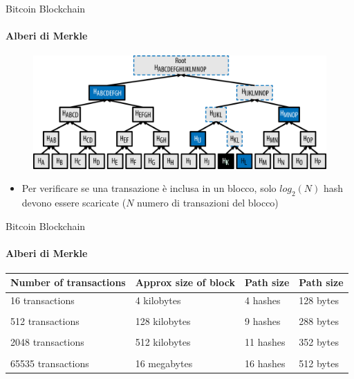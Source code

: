 \documentclass{beamer}
\begin{document}
  \begin{frame}{Bitcoin Blockchain}
    \framesubtitle{Alberi di Merkle}
    \begin{figure}
      \includegraphics[width=0.6\linewidth]{../img/merkle-tree-path.png}
    \end{figure}
    \begin{itemize}
        \item Per verificare se una transazione è inclusa in un blocco, solo  $log_2(N)$ hash devono essere scaricate ($N$ numero di transazioni del blocco)
    \end{itemize}
  \end{frame}
  
  
  
  
  
  \begin{frame}{Bitcoin Blockchain}
  \framesubtitle{Alberi di Merkle}
      \footnotesize
       \begin{tabularx}{\textwidth}{l l l l}
         \toprule
         \textbf{Number of transactions}	& \textbf{Approx size of block} & \textbf{Path size} &	\textbf{Path size}   \\ \midrule
         16 transactions & 4 kilobytes & 4 hashes & 128 bytes \\
         \\
         512 transactions & 128 kilobytes & 9 hashes & 288 bytes \\
         \\
         2048 transactions & 512 kilobytes & 11 hashes & 352 bytes \\
         \\
         65535 transactions & 16 megabytes & 16 hashes & 512 bytes \\
         \bottomrule
     \end{tabularx}
  \end{frame}
  
  
  
  
\end{document}
